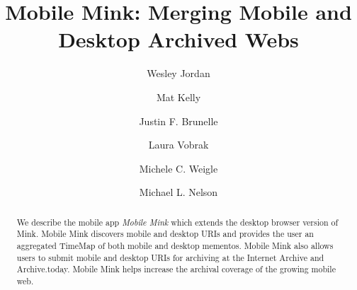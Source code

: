 \documentclass{sig-alternate}
\begin{document}
\title{Mobile Mink: Merging Mobile and Desktop Archived Webs}




\author[1]{Wesley Jordan}
\author[2]{Mat Kelly}
\author[2,3]{Justin F. Brunelle}
\author[1]{Laura Vobrak}
\author[2]{Michele C. Weigle}
\author[2]{Michael L. Nelson}

       
\maketitle
\begin{abstract}
We describe the mobile app \emph{Mobile Mink} which extends the desktop browser version of Mink. Mobile Mink discovers mobile and desktop URIs and provides the user an aggregated TimeMap of both mobile and desktop mementos. Mobile Mink also allows users to submit mobile and desktop URIs for archiving at the Internet Archive and Archive.today. Mobile Mink helps increase the archival coverage of the growing mobile web.
\end{abstract}



\end{document}
